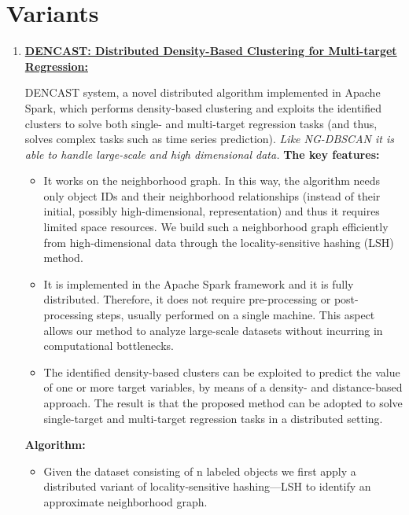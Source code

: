 \documentclass[acmsmall]{acmart}
\begin{document}
\section* {Variants}
\begin{enumerate}
    \item \textcolor{blue}{\textbf{\href{https://journalofbigdata.springeropen.com/articles/10.1186/s40537-019-0207-2}{DENCAST: Distributed Density-Based Clustering for Multi-target Regression:}}}
    
    DENCAST system, a novel distributed algorithm implemented in Apache Spark, which performs density-based clustering and exploits the identified clusters to solve both single- and multi-target regression tasks (and thus, solves complex tasks such as time series prediction). 
    \newline 
    \textit{Like NG-DBSCAN it is able to handle large-scale and high dimensional data.}
    \vspace{3pt} \newline 
    \textbf{The key features:}
    \begin{itemize}
        \item It works on the neighborhood graph. In this way, the algorithm needs only object IDs and their neighborhood relationships (instead of their initial, possibly high-dimensional, representation) and thus it requires limited space resources. We build such a neighborhood graph efficiently from high-dimensional data through the locality-sensitive hashing (LSH) method.
        \item It is implemented in the Apache Spark framework and it is fully distributed. Therefore, it does not require pre-processing or post-processing steps, usually performed on a single machine. This aspect allows our method to analyze large-scale datasets without incurring in computational bottlenecks.
        \item The identified density-based clusters can be exploited to predict the value of one or more target variables, by means of a density- and distance-based approach. The result is that the proposed method can be adopted to solve single-target and multi-target regression tasks in a distributed setting.
    \end{itemize}
    \vspace{5pt}
    \textbf{Algorithm:}
    \begin{itemize}
        \item Given the dataset consisting of n labeled objects we first apply a distributed variant of locality-sensitive hashing—LSH to identify an approximate neighborhood graph.

\end{itemize}
\end{enumerate}
\end{document}
